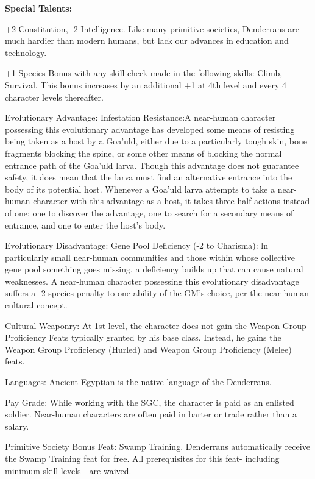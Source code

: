 \textbf{Special Talents:}
\begin{itemize*}
\item +2 Constitution, -2 Intelligence. Like many primitive societies, Denderrans are much hardier than modern humans, but lack our advances in education and technology.
\item +1 Species Bonus with any skill check made in the following skills: Climb, Survival. This bonus increases by an additional +1 at 4th level and every 4 character levels thereafter.
\item Evolutionary Advantage: Infestation Resistance:A near-human character possessing this evolutionary advantage has developed some means of resisting being taken as a host by a Goa'uld, either due to a particularly tough skin, bone fragments blocking the spine, or some other means of blocking the normal entrance path of the Goa'uld larva. Though this advantage does not guarantee safety, it does mean that the larva must find an alternative entrance into the body of its potential host. Whenever a Goa'uld larva attempts to take a near-human character with this advantage as a host, it takes three half actions instead of one: one to discover the advantage, one to search for a secondary means of entrance, and one to enter the host's body. 
\item Evolutionary Disadvantage: Gene Pool Deficiency (-2 to Charisma):  ln particularly small near-human communities and those within whose collective gene pool something goes missing, a deficiency builds up that can cause natural weaknesses. A near-human character possessing this evolutionary disadvantage suffers a -2 species penalty to one ability of the GM's choice, per the near-human cultural concept.
\item Cultural Weaponry: At 1st level, the character does not gain the Weapon Group Proficiency Feats typically granted by his base class. Instead, he gains the Weapon Group Proficiency (Hurled) and Weapon Group Proficiency (Melee) feats.
\item Languages: Ancient Egyptian is the native language of the Denderrans.
\item Pay Grade: While working with the SGC, the character is paid as an enlisted soldier. Near-human characters are often paid in barter or trade rather than a salary.
\item Primitive Society Bonus Feat: Swamp Training. Denderrans automatically receive the Swamp Training feat for free. All prerequisites for this feat- including minimum skill levels - are waived.
\end{itemize*}

